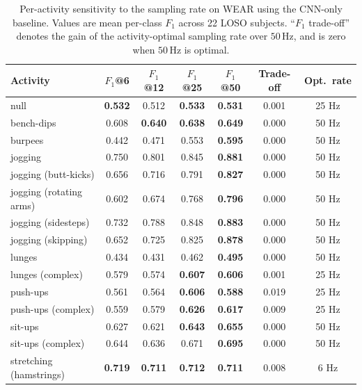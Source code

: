 \begin{table}[H]
  \centering
  \caption{Per-activity sensitivity to the sampling rate on WEAR using the CNN-only baseline. Values are mean per-class $F_1$ across 22 LOSO subjects. ``$F_1$ trade-off'' denotes the gain of the activity-optimal sampling rate over $50$\,Hz, and is zero when $50$\,Hz is optimal.}
  \label{tab:freq_perclass_wear_standard_cnn}
  \begin{tabular}{lcccccc}
    \toprule
    Activity & $F_1$@6 & $F_1$@12 & $F_1$@25 & $F_1$@50 & Trade-off & Opt.\ rate \\
    \midrule
    null                           & \textbf{0.532} & 0.512 & \textbf{0.533} & \textbf{0.531} & 0.001 & 25 Hz \\
    bench-dips                     & 0.608 & \textbf{0.640} & \textbf{0.638} & \textbf{0.649} & 0.000 & 50 Hz \\
    burpees                        & 0.442 & 0.471 & 0.553 & \textbf{0.595} & 0.000 & 50 Hz \\
    jogging                        & 0.750 & 0.801 & 0.845 & \textbf{0.881} & 0.000 & 50 Hz \\
    jogging (butt-kicks)           & 0.656 & 0.716 & 0.791 & \textbf{0.827} & 0.000 & 50 Hz \\
    jogging (rotating arms)        & 0.602 & 0.674 & 0.768 & \textbf{0.796} & 0.000 & 50 Hz \\
    jogging (sidesteps)            & 0.732 & 0.788 & 0.848 & \textbf{0.883} & 0.000 & 50 Hz \\
    jogging (skipping)             & 0.652 & 0.725 & 0.825 & \textbf{0.878} & 0.000 & 50 Hz \\
    lunges                         & 0.434 & 0.431 & 0.462 & \textbf{0.495} & 0.000 & 50 Hz \\
    lunges (complex)               & 0.579 & 0.574 & \textbf{0.607} & \textbf{0.606} & 0.001 & 25 Hz \\
    push-ups                       & 0.561 & 0.564 & \textbf{0.606} & \textbf{0.588} & 0.019 & 25 Hz \\
    push-ups (complex)             & 0.559 & 0.579 & \textbf{0.626} & \textbf{0.617} & 0.009 & 25 Hz \\
    sit-ups                        & 0.627 & 0.621 & \textbf{0.643} & \textbf{0.655} & 0.000 & 50 Hz \\
    sit-ups (complex)              & 0.644 & 0.636 & 0.671 & \textbf{0.695} & 0.000 & 50 Hz \\
    stretching (hamstrings)        & \textbf{0.719} & \textbf{0.711} & \textbf{0.712} & \textbf{0.711} & 0.008 & 6 Hz \\

\end{tabular}
\end{table}
